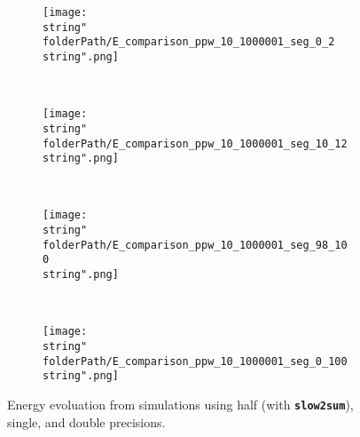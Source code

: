 

\renewcommand{\folderPath}{\string"./fig/2D_example/marmousi2_101_401/nvidia_plot_dt_h_10_1p000165939331055e-04_6R_dt_s_10_9p999999747378752e-05_6R_dt_d_10_1p000000000000000e-04_6R/half_chop_D_chop_dx_chop_dt_single_double/\string"}

  


\begin{figure}[H]
\captionsetup{width=0.95\textwidth,font=footnotesize,labelfont=footnotesize}
\centering
%
\begin{subfigure}[b]{1\textwidth}
%
\centering\texttt{[image: \\string"\\folderPath/E\_comparison\_ppw\_10\_1000001\_seg\_0\_2\\string".png]}
%
\end{subfigure}\hfill
\\[2ex]
%
\begin{subfigure}[b]{1\textwidth}
%
\centering\texttt{[image: \\string"\\folderPath/E\_comparison\_ppw\_10\_1000001\_seg\_10\_12\\string".png]}
%
\end{subfigure}\hfill
\\[2ex]
%
\begin{subfigure}[b]{1\textwidth}
%
\centering\texttt{[image: \\string"\\folderPath/E\_comparison\_ppw\_10\_1000001\_seg\_98\_100\\string".png]}
%
\end{subfigure}\hfill
\\[2ex]
%
\begin{subfigure}[b]{1\textwidth}
%
\centering\texttt{[image: \\string"\\folderPath/E\_comparison\_ppw\_10\_1000001\_seg\_0\_100\\string".png]}
%
\end{subfigure}\hfill
%
\caption{Energy evoluation from simulations using half (with \textbf{\texttt{\footnotesize slow2sum}}), single, and double precisions.}
\label{comparison_E_half_compensated_single_double_marmousi2}
\end{figure}


